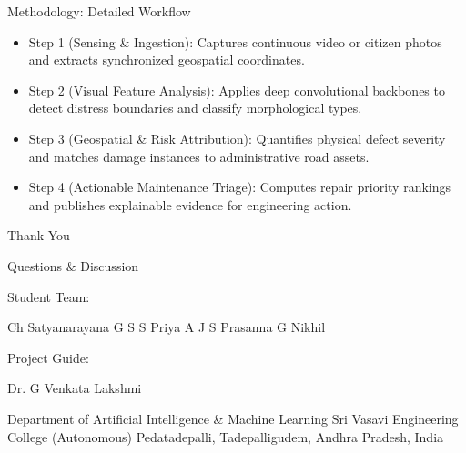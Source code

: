 \documentclass[10pt]{beamer}
\def\\{}%
\def\textbf#1{#1}%
\def\small{}%
\def\footnotesize{}%
\def\scriptsize{}%
\def\large{}%
\def\Large{}%
\def\begin#1{}%
\def\end#1{}%
\def\vspace#1{}%
\begin{document}
\begin{frame}{Methodology: Detailed Workflow}
\begin{center}
    \end{center}
    \vspace{0.4em}
    \begin{itemize}
        \setlength{\itemsep}{0.4em}
        \item \textbf{Step 1 (Sensing \& Ingestion):} Captures continuous video or citizen photos and extracts synchronized geospatial coordinates.
        \item \textbf{Step 2 (Visual Feature Analysis):} Applies deep convolutional backbones to detect distress boundaries and classify morphological types.
        \item \textbf{Step 3 (Geospatial \& Risk Attribution):} Quantifies physical defect severity and matches damage instances to administrative road assets.
        \item \textbf{Step 4 (Actionable Maintenance Triage):} Computes repair priority rankings and publishes explainable evidence for engineering action.
    \end{itemize}
\end{frame}

\begin{frame}{Thank You}
    \centering
    \vspace{0.3cm}
    {\Large \textbf{\color{svecRed}Questions \& Discussion}}
    \vspace{0.6cm}
    
    \textbf{\large Student Team:} \\
    \vspace{0.3em}
    Ch Satyanarayana \quad G S S Priya \quad A J S Prasanna \quad G Nikhil \\
    \vspace{0.6cm}
    
    \textbf{Project Guide:} \\
    \vspace{0.2em}
    Dr. G Venkata Lakshmi \\
    \vspace{0.4em}
    {\small Department of Artificial Intelligence \& Machine Learning} \\
    {\footnotesize Sri Vasavi Engineering College (Autonomous)} \\
    {\scriptsize Pedatadepalli, Tadepalligudem, Andhra Pradesh, India}
\end{frame}
\end{document}
